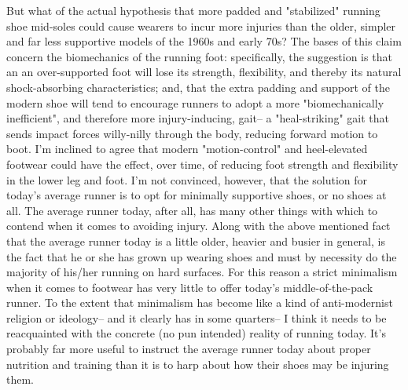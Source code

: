But what of the actual hypothesis that more padded and "stabilized" running shoe mid-soles could cause wearers to incur more injuries than the older, simpler and far less supportive models of the 1960s and early 70s? The bases of this claim concern the biomechanics of the running foot: specifically, the suggestion is that an an over-supported foot will lose its strength, flexibility, and thereby its natural shock-absorbing characteristics; and, that the extra padding and support of the modern shoe will tend to encourage runners to adopt a more "biomechanically inefficient", and therefore more injury-inducing, gait-- a "heal-striking" gait that sends impact forces willy-nilly through the body, reducing forward motion to boot. I'm inclined to agree that modern "motion-control" and heel-elevated footwear could have the effect, over time, of reducing foot strength and flexibility in the lower leg and foot. I'm not convinced, however, that the solution for today's average runner is to opt for minimally supportive shoes, or no shoes at all. The average runner today, after all, has many other things with which to contend when it comes to avoiding injury. Along with the above mentioned fact that the average runner today is a little older, heavier and busier in general, is the fact that he or she has grown up wearing shoes and must by necessity do the majority of his/her running on hard surfaces. For this reason a strict minimalism when it comes to footwear has very little to offer today's middle-of-the-pack runner. To the extent that minimalism has become like a kind of anti-modernist religion or ideology-- and it clearly has in some quarters-- I think it needs to be reacquainted with the concrete (no pun intended) reality of running today. It's probably far more useful to instruct the average runner today about proper nutrition and training than it is to harp about how their shoes may be injuring them.

